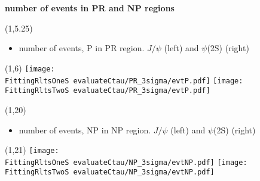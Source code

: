 \documentclass[11pt,slidescentered,red,compress,handout,hyperref={bookmarks=true},mathseriftable]{beamer}
\newcommand{\FittingRltsOneS}{../Psi1S/Fit/parameter/}
\newcommand{\FittingRltsTwoS}{../Psi2S/Fit/parameter/}
\begin{document}
\section{}
\begin{frame}[t]{\small \bf number of events in PR and NP regions}{}
\begin{textblock}{48}(1,5.25)
\begin{itemize}
\scriptsize \item  number of events, P in PR region. $J/\psi$ (left) and $\psi$(2S) (right)
\end{itemize}
\end{textblock}
\begin{textblock}{48}(1,6)
\hspace*{10pt} \texttt{[image: \\FittingRltsOneS evaluateCtau/PR\_3sigma/evtP.pdf]}
\hspace*{10pt} \texttt{[image: \\FittingRltsTwoS evaluateCtau/PR\_3sigma/evtP.pdf]}
\end{textblock}

\begin{textblock}{48}(1,20)
\begin{itemize}
\scriptsize \item  number of events, NP in NP region. $J/\psi$ (left) and $\psi$(2S) (right)
\end{itemize}
\end{textblock}
\begin{textblock}{48}(1,21)
\hspace*{10pt} \texttt{[image: \\FittingRltsOneS evaluateCtau/NP\_3sigma/evtNP.pdf]}
\hspace*{10pt} \texttt{[image: \\FittingRltsTwoS evaluateCtau/NP\_3sigma/evtNP.pdf]}
\end{textblock}

\end{frame}
\end{document}
